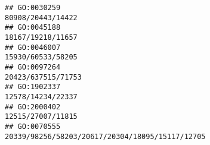 \documentclass[
]{article}
\begin{document}
\begin{verbatim}
## GO:0030259                                                                                                                                                                                                                                                                                                                                                                                            80908/20443/14422
## GO:0045188                                                                                                                                                                                                                                                                                                                                                                                            18167/19218/11657
## GO:0046007                                                                                                                                                                                                                                                                                                                                                                                            15930/60533/58205
## GO:0097264                                                                                                                                                                                                                                                                                                                                                                                           20423/637515/71753
## GO:1902337                                                                                                                                                                                                                                                                                                                                                                                            12578/14234/22337
## GO:2000402                                                                                                                                                                                                                                                                                                                                                                                            12515/27007/11815
## GO:0070555                                                                                                                                                                                                                                                                                                                                                              20339/98256/58203/20617/20304/18095/15117/12705

\end{verbatim}
\end{document}
